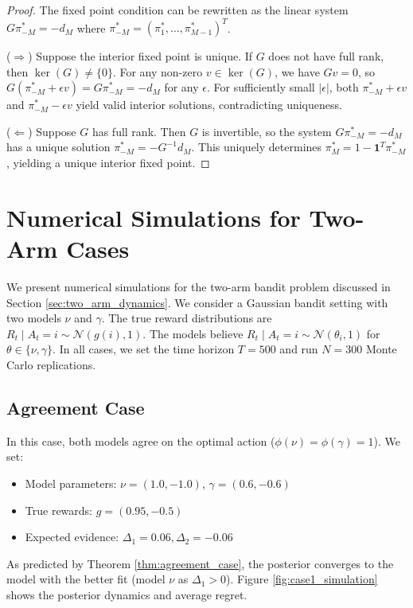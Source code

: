\documentclass[12pt]{article}
\begin{document}
    \begin{proof}
    The fixed point condition can be rewritten as the linear system $G \pi_{-M}^* = -d_M$ where $\pi_{-M}^* = (\pi_1^*, \ldots, \pi_{M-1}^*)^T$.
    
    ($\Rightarrow$) Suppose the interior fixed point is unique. If $G$ does not have full rank, then $\ker(G) \neq \{0\}$. For any non-zero $v \in \ker(G)$, we have $G v = 0$, so $G(\pi_{-M}^* + \epsilon v) = G\pi_{-M}^* = -d_M$ for any $\epsilon$. For sufficiently small $|\epsilon|$, both $\pi_{-M}^* + \epsilon v$ and $\pi_{-M}^* - \epsilon v$ yield valid interior solutions, contradicting uniqueness.
    
    ($\Leftarrow$) Suppose $G$ has full rank. Then $G$ is invertible, so the system $G \pi_{-M}^* = -d_M$ has a unique solution $\pi_{-M}^* = -G^{-1} d_M$. This uniquely determines $\pi_M^* = 1 - \mathbf{1}^T \pi_{-M}^*$, yielding a unique interior fixed point.
\end{proof}


\section{Numerical Simulations for Two-Arm Cases}
\label{app:simulations}

We present numerical simulations for the two-arm bandit problem discussed in Section \ref{sec:two_arm_dynamics}. We consider a Gaussian bandit setting with two models $\nu$ and $\gamma$. The true reward distributions are $R_t \mid A_t = i \sim \mathcal{N}(g(i), 1)$. The models believe $R_t \mid A_t = i \sim \mathcal{N}(\theta_i, 1)$ for $\theta \in \{\nu, \gamma\}$. In all cases, we set the time horizon $T=500$ and run $N=300$ Monte Carlo replications.

\subsection{Agreement Case}
In this case, both models agree on the optimal action ($\phi(\nu) = \phi(\gamma) = 1$). We set:
\begin{itemize}
    \item Model parameters: $\nu = (1.0, -1.0)$, $\gamma = (0.6, -0.6)$
    \item True rewards: $g = (0.95, -0.5)$
    \item Expected evidence: $\Delta_1 = 0.06, \Delta_2 = -0.06$
\end{itemize}
As predicted by Theorem \ref{thm:agreement_case}, the posterior converges to the model with the better fit (model $\nu$ as $\Delta_1 > 0$). Figure \ref{fig:case1_simulation} shows the posterior dynamics and average regret.
\end{document}
